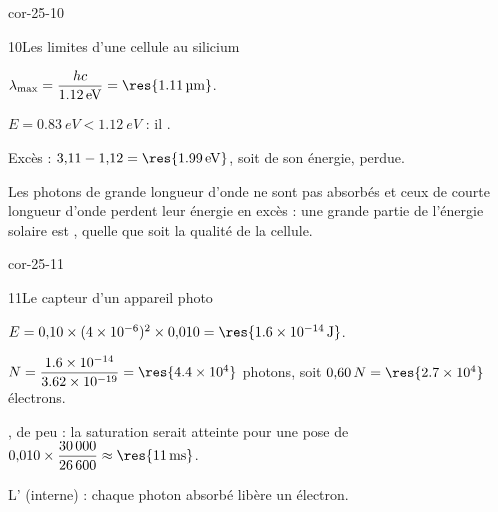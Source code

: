 \begin{blocLivre}{cor-25-10}
\begin{corrige}{10}{Les limites d'une cellule au silicium}
\begin{questions}
\item $\lambda_\mathrm{max}=\dfrac{hc}{\qty{1,12}{eV}}=\res{\qty{1,11}{\micro m}}$.
\item $E=\qty{0,83}{eV}<\qty{1,12}{eV}$ : il .
\item Excès : $3{,}11-1{,}12=\res{\qty{1,99}{eV}}$, soit  de son énergie, perdue.
\item Les photons de grande longueur d'onde ne sont pas absorbés et ceux de courte longueur d'onde perdent leur énergie
en excès : une grande partie de l'énergie solaire est , quelle que soit la qualité de la cellule.
\end{questions}
\end{corrige}
\end{blocLivre}
\begin{blocLivre}{cor-25-11}
\begin{corrige}{11}{Le capteur d'un appareil photo}
\begin{questions}
\item $E=0{,}10\times(\num{4e-6})^2\times0{,}010=\res{\qty{1,6e-14}{J}}$.
\item $N=\dfrac{\num{1.6e-14}}{\num{3.62e-19}}=\res{\num{4.4e4}}$ photons, soit $0{,}60\,N=\res{\num{2.7e4}}$ électrons.
\item {}, de peu : la saturation serait atteinte pour une pose de $0{,}010\times\dfrac{\num{30000}}{\num{26600}}\approx\res{\qty{11}{ms}}$.
\item L' (interne) : chaque photon absorbé libère un électron.
\end{questions}
\end{corrige}
\end{blocLivre}
